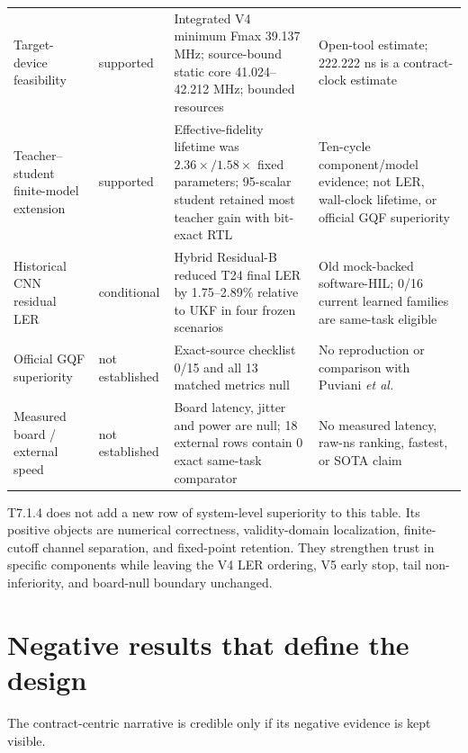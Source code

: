 \documentclass[11pt]{article}
\newcommand{\supported}{\textcolor{green!40!black}{supported}}
\newcommand{\conditional}{\textcolor{orange!75!black}{conditional}}
\newcommand{\blocked}{\textcolor{red!65!black}{not established}}
\begin{document}
{\begin{longtable}{@{}L{0.19\textwidth} L{0.18\textwidth} L{0.35\textwidth} L{0.18\textwidth}@{}}
Target-device feasibility & \supported & Integrated V4 minimum Fmax 39.137 MHz; source-bound static core 41.024--42.212 MHz; bounded resources & Open-tool estimate; 222.222 ns is a contract-clock estimate \\
Teacher--student finite-model extension & \supported & Effective-fidelity lifetime was $2.36\times/1.58\times$ fixed parameters; 95-scalar student retained most teacher gain with bit-exact RTL & Ten-cycle component/model evidence; not LER, wall-clock lifetime, or official GQF superiority \\
Historical CNN residual LER & \conditional & Hybrid Residual-B reduced T24 final LER by 1.75--2.89\% relative to UKF in four frozen scenarios & Old mock-backed software-HIL; 0/16 current learned families are same-task eligible \\
Official GQF superiority & \blocked & Exact-source checklist 0/15 and all 13 matched metrics null & No reproduction or comparison with Puviani \emph{et al.} \\
Measured board / external speed & \blocked & Board latency, jitter and power are null; 18 external rows contain 0 exact same-task comparator & No measured latency, raw-ns ranking, fastest, or SOTA claim \\
\bottomrule
\end{longtable}
}

T7.1.4 does not add a new row of system-level superiority to this table.  Its
positive objects are numerical correctness, validity-domain localization,
finite-cutoff channel separation, and fixed-point retention.  They strengthen
trust in specific components while leaving the V4 LER ordering, V5 early stop,
tail non-inferiority, and board-null boundary unchanged.

\section{Negative results that define the design}

The contract-centric narrative is credible only if its negative evidence is
kept visible.
\end{document}
